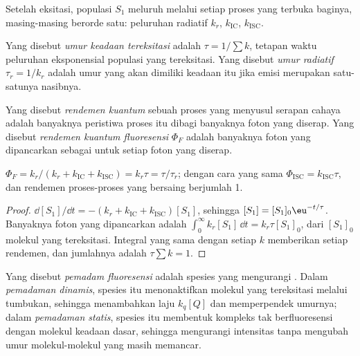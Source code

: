 Setelah eksitasi, populasi $S_1$ meluruh melalui setiap proses yang terbuka
baginya, masing-masing berorde satu: peluruhan radiatif $k_r$,  $k_{\mathrm{IC}}$,  $k_{\mathrm{ISC}}$.

\begin{definition}\label{def:b3:electronic-spectroscopy:lifetime}
Yang disebut \emph{umur keadaan tereksitasi}
adalah $\tau =
1/\sum k$, tetapan waktu peluruhan eksponensial populasi yang
tereksitasi. Yang disebut \emph{umur radiatif}
$\tau_r =
1/k_r$ adalah umur yang akan dimiliki keadaan itu jika emisi
merupakan satu-satunya nasibnya.
\end{definition}

\begin{definition}\label{def:b3:electronic-spectroscopy:quantum-yield}
Yang disebut \emph{rendemen kuantum} sebuah proses
yang menyusul serapan cahaya adalah banyaknya peristiwa proses itu dibagi
banyaknya foton yang diserap. Yang disebut \emph{rendemen kuantum
fluoresensi} $\Phi_F$ adalah banyaknya
foton yang dipancarkan sebagai  untuk setiap foton yang diserap.
\end{definition}

\begin{proposition}\label{prop:b3:electronic-spectroscopy:quantum-yield}
$\Phi_F = k_r/(k_r + k_{\mathrm{IC}} + k_{\mathrm{ISC}}) = k_r\tau = \tau/\tau_r$; dengan
cara yang sama $\Phi_{\mathrm{ISC}} = k_{\mathrm{ISC}}\tau$, dan rendemen proses-proses
yang bersaing berjumlah 1.
\end{proposition}

\begin{proof}
$\dd[S_1]/\dd t = -(k_r + k_{\mathrm{IC}} + k_{\mathrm{ISC}})[S_1]$, sehingga
$[S_1] = [S_1]_0\eu^{-t/\tau}$. Banyaknya foton yang dipancarkan adalah
$\int_0^\infty k_r[S_1]\,\dd t = k_r\tau[S_1]_0$, dari $[S_1]_0$ molekul yang
tereksitasi. Integral yang sama dengan setiap $k$ memberikan setiap rendemen,
dan jumlahnya adalah $\tau\sum k = 1$.
\end{proof}

\begin{definition}\label{def:b3:electronic-spectroscopy:quencher}
Yang disebut \emph{pemadam fluoresensi} adalah
spesies yang mengurangi . Dalam \emph{pemadaman
dinamis}, spesies itu menonaktifkan molekul yang
tereksitasi melalui tumbukan, sehingga menambahkan laju $k_q[Q]$ dan
memperpendek umurnya; dalam \emph{pemadaman statis},
spesies itu membentuk kompleks tak berfluoresensi dengan molekul keadaan
dasar, sehingga mengurangi intensitas tanpa mengubah umur molekul-molekul
yang masih memancar.
\end{definition}

